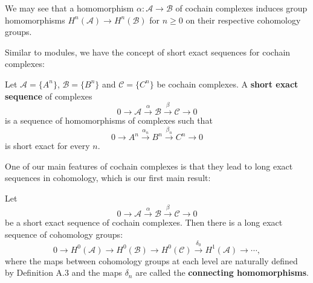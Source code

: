 \begin{definition}
\begin{center}
\end{center}
\end{definition}
We may see that a homomorphism $\alpha:\mathcal{A}\to\mathcal{B}$ of cochain complexes induces group homomorphisms $H^n(\mathcal{A})\to H^n(\mathcal{B})$ for $n\ge 0$ on their respective cohomology groups.\par
Similar to modules, we have the concept of short exact sequences for cochain complexes: 
\begin{definition}
Let $\mathcal{A}=\{A^n\}$, $\mathcal{B}=\{B^n\}$ and $\mathcal{C}=\{C^n\}$ be cochain complexes. A \textbf{short exact sequence} of complexes 
$$
0\longrightarrow \mathcal{A} \overset{\alpha}{\longrightarrow}\mathcal{B} \overset{\beta}{\longrightarrow}\mathcal{C} \longrightarrow 0
$$
is a sequence of homomorphisms of complexes such that 
$$
0\longrightarrow A^n\overset{\alpha _n}{\longrightarrow}B^n\overset{\beta _n}{\longrightarrow}C^n\longrightarrow 0
$$
is short exact for every $n$.
\end{definition}
One of our main features of cochain complexes is that they lead to long exact sequences in cohomology, which is our first main result: 
\begin{theorem}
Let 
$$
0\longrightarrow \mathcal{A} \overset{\alpha}{\longrightarrow}\mathcal{B} \overset{\beta}{\longrightarrow}\mathcal{C} \longrightarrow 0
$$
be a short exact sequence of cochain complexes. Then there is a long exact sequence of cohomology groups: 
$$
0\longrightarrow H^0\left( \mathcal{A} \right) \longrightarrow H^0\left( \mathcal{B} \right) \longrightarrow H^0\left( \mathcal{C} \right) \overset{\delta _0}{\longrightarrow}H^1\left( \mathcal{A} \right) \longrightarrow \cdots ,
$$
where the maps between cohomology groups at each level are naturally defined by Definition A.3 and the maps $\delta_n$ are called the \textbf{connecting homomorphisms}.
\end{theorem}
